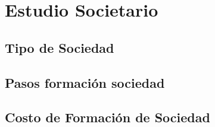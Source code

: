 \section{Estudio Societario}
    \subsection{Tipo de Sociedad}
    \subsection{Pasos formación sociedad}
    \subsection{Costo de Formación de Sociedad}